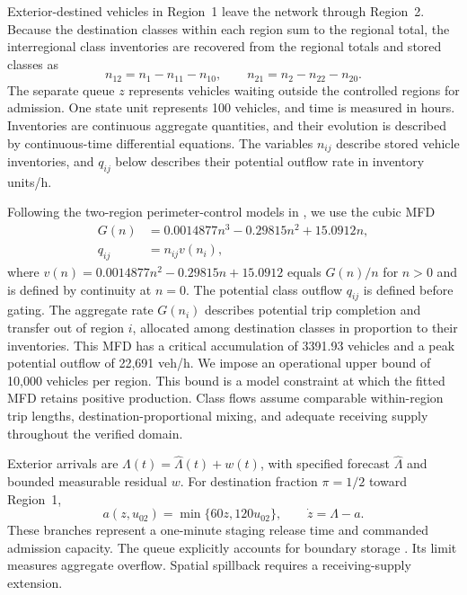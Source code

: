 \documentclass[preprint,12pt]{elsarticle}
\begin{document}
Exterior-destined vehicles in Region~1 leave the network through Region~2.
Because the destination classes within each region sum to the regional total,
the interregional class inventories are recovered from the regional totals
and stored classes as
\[
n_{12}=n_1-n_{11}-n_{10}, \qquad
n_{21}=n_2-n_{22}-n_{20}.
\]
The separate queue $z$ represents vehicles waiting outside the controlled
regions for admission. One state unit represents 100 vehicles, and time is
measured in hours. Inventories are continuous aggregate quantities, and
their evolution is described by continuous-time differential equations.
The variables $n_{ij}$ describe stored vehicle inventories, and $q_{ij}$ below
describes their potential outflow rate in inventory units/h.

Following the two-region perimeter-control models in
\cite{zhong2018robust,geroliminis2013mpc}, we use the cubic MFD
\begin{equation}
\begin{aligned}
G(n)&=0.0014877n^3-0.29815n^2+15.0912n,\\
q_{ij}&=n_{ij}v(n_i),
\end{aligned}
\label{eq:new-mfd}
\end{equation}
where
$v(n)=0.0014877n^2-0.29815n+15.0912$
equals $G(n)/n$ for $n>0$ and is defined by continuity at $n=0$. The potential class outflow $q_{ij}$ is defined
before gating. The aggregate rate $G(n_i)$ describes potential trip
completion and transfer out of region $i$, allocated among destination
classes in proportion to their inventories. This MFD has a critical accumulation of 3391.93 vehicles
and a peak potential outflow of 22,691 veh/h. We impose an operational upper bound of 10,000 vehicles per region. This bound is a model constraint at which the fitted MFD retains positive production. Class flows assume comparable within-region trip
lengths, destination-proportional mixing, and adequate receiving supply
throughout the verified domain.

Exterior arrivals are $\Lambda(t)=\widehat\Lambda(t)+w(t)$, with specified
forecast $\widehat\Lambda$ and bounded measurable residual $w$.
For destination fraction $\pi=1/2$ toward Region~1,
\begin{equation}
a(z,u_{02})=\min\{60z,120u_{02}\},\qquad
\dot z=\Lambda-a.
\label{eq:new-admission}
\end{equation}
These branches represent a one-minute staging release time and commanded
admission capacity. The queue explicitly accounts for boundary storage
\cite{haddad2017queues}. Its limit measures aggregate overflow. Spatial
spillback requires a receiving-supply extension.
\end{document}
